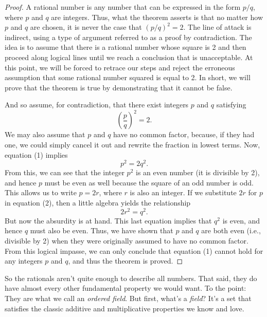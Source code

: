 \documentclass[11pt,twoside=off,numbers=noenddot]{scrbook}
\begin{document}
\begin{proof}
  A rational number is any number that can be expressed in the form
  $p/q$, where $p$ and $q$ are integers. Thus, what the theorem
  asserts is that no matter how $p$ and $q$ are chosen, it is never
  the case that $(p/q)^2 = 2$. The line of attack is indirect, using
  a type of argument referred to as a proof by contradiction. The
  idea is to assume that there is a rational number whose square is 2
  and then proceed along logical lines until we reach a conclusion
  that is unacceptable. At this point, we will be forced to retrace
  our steps and reject the erroneous assumption that some rational
  number squared is equal to 2. In short, we will prove that the
  theorem is true by demonstrating that it cannot be false.

  And so assume, for contradiction, that there exist integers $p$ and
  $q$ satisfying
  \[ \left(\frac{p}{q}\right)^2 = 2. \tag{1} \]
  We may also assume that $p$ and $q$ have no common factor, because,
  if they had one, we could simply cancel it out and rewrite the
  fraction in lowest terms. Now, equation (1) implies
  \[ p^2 = 2q^2. \tag{2} \]
  From this, we can see that the integer $p^2$ is an even number (it
  is divisible by 2), and hence $p$ must be even as well because the
  square of an odd number is odd. This allows us to write $p = 2r$,
  where $r$ is also an integer. If we substitute $2r$ for $p$ in
  equation (2), then a little algebra yields the relationship
  \[ 2r^2 = q^2. \]
  But now the absurdity is at hand. This last equation implies that
  $q^2$ is even, and hence $q$ must also be even. Thus, we have shown
  that $p$ and $q$ are both even (i.e., divisible by 2) when they
  were originally assumed to have no common factor. From this logical
  impasse, we can only conclude that equation (1) cannot hold for any
  integers $p$ and $q$, and thus the theorem is proved.
\end{proof}

\begin{remark}
  So the rationals aren't quite enough to describe all numbers. That
  said, they do have almost every other fundamental property we would
  want. To the point: They are what we call an \textit{ordered
  field}. But first, what's a \textit{field}? It's a set that
  satisfies the classic additive and multiplicative properties we know and love.
\end{remark}
\end{document}
